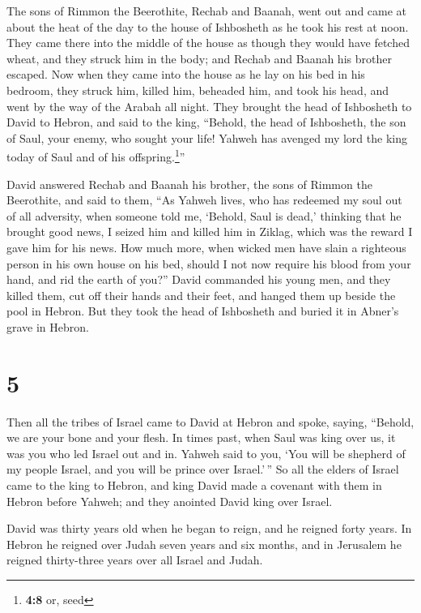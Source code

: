  The sons of Rimmon the Beerothite, Rechab and Baanah,
went out and came at about the heat of the day to the house of
Ishbosheth as he took his rest at noon.  They came there
into the middle of the house as though they would have fetched wheat,
and they struck him in the body; and Rechab and Baanah his brother
escaped.  Now when they came into the house as he lay on
his bed in his bedroom, they struck him, killed him, beheaded him, and
took his head, and went by the way of the Arabah all night.
 They brought the head of Ishbosheth to David to Hebron,
and said to the king, ``Behold, the head of Ishbosheth, the son of Saul,
your enemy, who sought your life! Yahweh has avenged my lord the king
today of Saul and of his offspring.\footnote{\textbf{4:8} or, seed}''

 David answered Rechab and Baanah his brother, the sons of
Rimmon the Beerothite, and said to them, ``As Yahweh lives, who has
redeemed my soul out of all adversity,  when someone told
me, `Behold, Saul is dead,' thinking that he brought good news, I seized
him and killed him in Ziklag, which was the reward I gave him for his
news.  How much more, when wicked men have slain a
righteous person in his own house on his bed, should I not now require
his blood from your hand, and rid the earth of you?'' 
David commanded his young men, and they killed them, cut off their hands
and their feet, and hanged them up beside the pool in Hebron. But they
took the head of Ishbosheth and buried it in Abner's grave in Hebron.

\hypertarget{section-4}{%
\section{5}\label{section-4}}

 Then all the tribes of Israel came to David at Hebron and
spoke, saying, ``Behold, we are your bone and your flesh. 
In times past, when Saul was king over us, it was you who led Israel out
and in. Yahweh said to you, `You will be shepherd of my people Israel,
and you will be prince over Israel.'\,''  So all the
elders of Israel came to the king to Hebron, and king David made a
covenant with them in Hebron before Yahweh; and they anointed David king
over Israel.

 David was thirty years old when he began to reign, and he
reigned forty years.  In Hebron he reigned over Judah
seven years and six months, and in Jerusalem he reigned thirty-three
years over all Israel and Judah.

